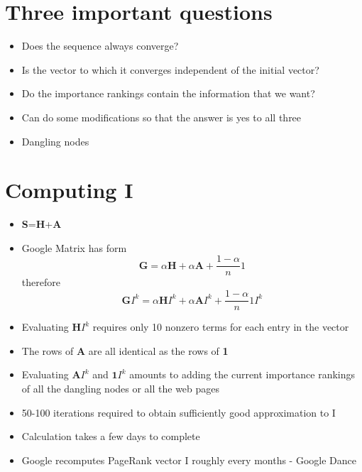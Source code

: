 \documentclass[11pt]{report}
\begin{document}
\section{Three important questions}
\begin{itemize}
\item Does the sequence always converge?
\item Is the vector to which it converges independent of the initial vector?
\item Do the importance rankings contain the information that we want?
\item Can do some modifications so that the answer is yes to all three
\item Dangling nodes
\end{itemize}
\section{Computing I}
\begin{itemize}
\item \textbf{S}=\textbf{H}+\textbf{A}
\item Google Matrix has form \begin{equation}
\textbf{G}=\alpha\textbf{H}+\alpha\textbf{A}+\frac{1-\alpha}{n}1
\end{equation} therefore \begin{equation}
\textbf{G}I^k=\alpha\textbf{H}I^k+\alpha\textbf{A}I^k+\frac{1-\alpha}{n}1I^k
\end{equation}
\item Evaluating $\textbf{H}I^k$ requires only 10 nonzero terms for each entry in the vector
\item The rows of \textbf{A} are all identical as the rows of \textbf{1}
\item Evaluating $\textbf{A}I^k$ and $\textbf{1}I^k$ amounts to adding the current importance rankings of all the dangling nodes or all the web pages
\item 50-100 iterations required to obtain sufficiently good approximation to I
\item Calculation takes a few days to complete
\item Google recomputes PageRank vector I roughly every months - Google Dance
\end{itemize}
\end{document}
